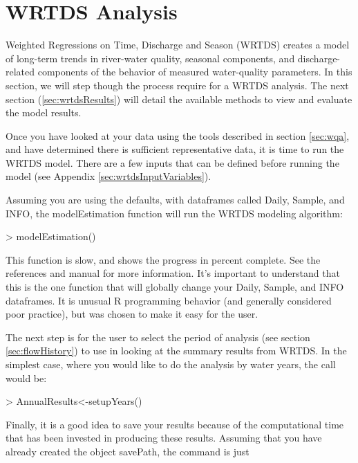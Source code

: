 \documentclass[a4paper,11pt]{article}
\begin{document}
\section{WRTDS Analysis}
\label{sec:wrtds}
Weighted Regressions on Time, Discharge and Season (WRTDS) creates a model of long-term trends in river-water quality, seasonal components, and discharge-related components of the behavior of measured water-quality parameters. In this section, we will step though the process require for a WRTDS analysis. The next section (\ref{sec:wrtdsResults}) will detail the available methods to view and evaluate the model results. 

Once you have looked at your data using the tools described in section \ref{sec:wqa}, and have determined there is sufficient representative data, it is time to run the WRTDS model. There are a few inputs that can be defined before running the model (see Appendix \ref{sec:wrtdsInputVariables}).

Assuming you are using the defaults, with dataframes called Daily, Sample, and INFO, the modelEstimation function will run the WRTDS modeling algorithm:

\begin{Schunk}
\begin{Sinput}
> modelEstimation()
\end{Sinput}
\end{Schunk}

This function is slow, and shows the progress in percent complete. See the references and manual for more information. It's important to understand that this is the one function that will globally change your Daily, Sample, and INFO dataframes. It is unusual R programming behavior (and generally considered poor practice), but was chosen to make it easy for the user.

The next step is for the user to select the period of analysis (see section \ref{sec:flowHistory}) to use in looking at the summary results from WRTDS. In the simplest case, where you would like to do the analysis by water years, the call would be:

\begin{Schunk}
\begin{Sinput}
> AnnualResults<-setupYears()
\end{Sinput}
\end{Schunk}

Finally, it is a good idea to save your results because of the computational time that has been invested in producing these results. Assuming that you have already created the object savePath, the command is just 
\end{document}
